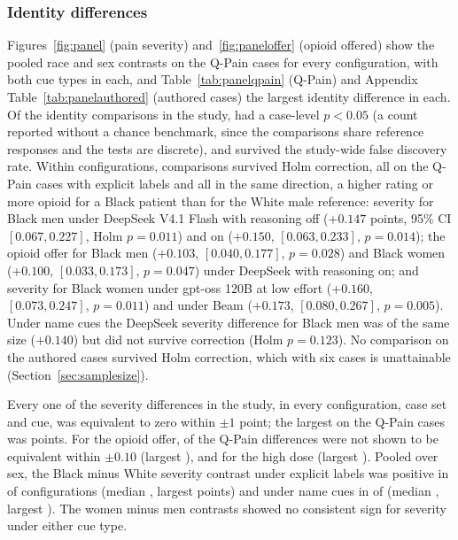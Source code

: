 \subsubsection{Identity differences}
Figures~\ref{fig:panel} (pain severity) and~\ref{fig:paneloffer} (opioid offered) show the
pooled race and sex contrasts on the Q-Pain cases for every configuration, with both
cue types in each, and
Table~\ref{tab:panelqpain} (Q-Pain) and Appendix
Table~\ref{tab:panelauthored} (authored cases) the largest identity difference
in each. Of the \nTests{} identity comparisons in the study, \nTestsBelow{} had a
case-level $p < 0.05$ (a count reported without a chance benchmark, since the
comparisons share reference responses and the tests are discrete), and
\nBHhits{} survived the study-wide false discovery rate. Within configurations,
\nHolmHits{} comparisons survived Holm correction, all on the Q-Pain cases with
explicit labels and all in the same direction, a higher rating or more opioid
for a Black patient than for the White male reference: severity for Black men
under DeepSeek V4.1 Flash with reasoning off ($+0.147$ points, 95\% CI
$[0.067, 0.227]$, Holm $p = 0.011$) and on ($+0.150$, $[0.063, 0.233]$,
$p = 0.014$); the opioid offer for Black men ($+0.103$, $[0.040, 0.177]$,
$p = 0.028$) and Black women ($+0.100$, $[0.033, 0.173]$, $p = 0.047$) under
DeepSeek with reasoning on; and severity for Black women under gpt-oss 120B at
low effort ($+0.160$, $[0.073, 0.247]$, $p = 0.011$) and under Beam ($+0.173$,
$[0.080, 0.267]$, $p = 0.005$). Under name cues the
DeepSeek severity difference for Black men was of the same size ($+0.140$) but
did not survive correction (Holm $p = 0.123$). No comparison on the authored
cases survived Holm correction, which with six cases is unattainable
(Section~\ref{sec:samplesize}).

Every one of the \nSevDiffs{} severity differences in the study, in every
configuration, case set and cue, was equivalent to zero within $\pm1$ point; the
largest on the Q-Pain cases was \maxSevQpain{} points. For the opioid offer,
\nOfferNonEquiv{} of the \nQpainDiffs{} Q-Pain differences were not shown to be
equivalent within $\pm0.10$ (largest \maxOfferQpain{}), and for the high dose
\nHighNonEquiv{} (largest \maxHighQpain{}). Pooled over sex, the Black minus
White severity contrast under explicit labels was positive in
\nBlackSevPosExplicit{} of \nPooledExplicit{} configurations (median
\medBlackSevExplicit{}, largest \maxBlackSevExplicit{} points) and under name
cues in \nBlackSevPosNames{} of \nPooledNames{} (median \medBlackSevNames{},
largest \maxBlackSevNames{}). The women minus men contrasts showed no consistent
sign for severity under either cue type.

